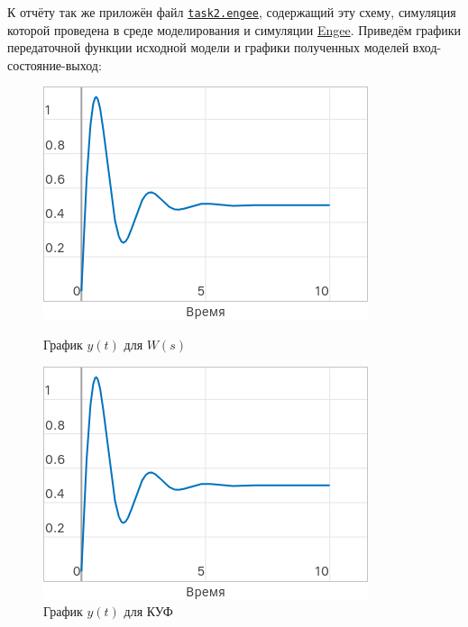 \documentclass[a4paper]{article}
\begin{document}
К отчёту так же приложён файл \href{run:sources}{\texttt{task2.engee}}, содержащий эту схему, симуляция которой проведена в среде моделирования и симуляции \href{https://start.engee.com/}{Engee}.\newpage
Приведём графики передаточной функции исходной модели и графики полученных моделей вход-состояние-выход:
\begin{figure}[H]
    \centering
    \begin{minipage}{0.32\textwidth}
        \includegraphics[width=\textwidth]{sources/task2_wp.png}
        \caption*{График $y(t)$ для $W(s)$}
    \end{minipage}
    \hfill
    \begin{minipage}{0.32\textwidth}
        \includegraphics[width=\textwidth]{sources/task2_kuf.png}
        \caption*{График $y(t)$ для КУФ}

\end{minipage}
\end{figure}
\end{document}
